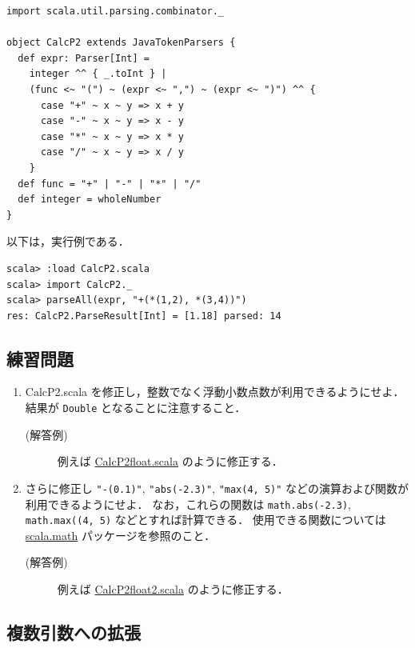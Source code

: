 \documentclass[a4j]{jsarticle}
\begin{document}
\begin{verbatim}
import scala.util.parsing.combinator._

object CalcP2 extends JavaTokenParsers {
  def expr: Parser[Int] =
    integer ^^ { _.toInt } |
    (func <~ "(") ~ (expr <~ ",") ~ (expr <~ ")") ^^ {
      case "+" ~ x ~ y => x + y
      case "-" ~ x ~ y => x - y
      case "*" ~ x ~ y => x * y
      case "/" ~ x ~ y => x / y
    }
  def func = "+" | "-" | "*" | "/"
  def integer = wholeNumber
}
\end{verbatim}

以下は，実行例である．

\begin{verbatim}
scala> :load CalcP2.scala
scala> import CalcP2._
scala> parseAll(expr, "+(*(1,2), *(3,4))")
res: CalcP2.ParseResult[Int] = [1.18] parsed: 14
\end{verbatim}
\subsection{練習問題}
\label{sec-4-4}

\begin{enumerate}
\item CalcP2.scala を修正し，整数でなく浮動小数点数が利用できるようにせよ．
     結果が \texttt{Double} となることに注意すること．
\begin{description}
\item[(解答例)] 例えば \href{file:///home/tamura/lect2/ProLang/2018/org/prog/parser/CalcP2float.scala}{CalcP2float.scala} のように修正する．
\end{description}
\item さらに修正し \texttt{"-(0.1)"}, \texttt{"abs(-2.3)"}, \texttt{"max(4, 5)"} などの演算および関数が利用できるようにせよ．
     なお，これらの関数は \texttt{math.abs(-2.3)}, \texttt{math.max((4, 5)} などとすれば計算できる．
     使用できる関数については \href{http://www.scala-lang.org/api/current/scala/math/}{scala.math} パッケージを参照のこと．
\begin{description}
\item[(解答例)] 例えば \href{file:///home/tamura/lect2/ProLang/2018/org/prog/parser/CalcP2float2.scala}{CalcP2float2.scala} のように修正する．
\end{description}
\end{enumerate}
\subsection{複数引数への拡張}
\label{sec-4-5}
\end{document}
